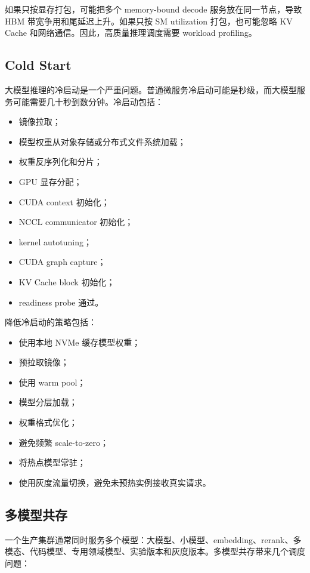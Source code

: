 如果只按显存打包，可能把多个 memory-bound decode 服务放在同一节点，导致 HBM 带宽争用和尾延迟上升。如果只按 SM utilization 打包，也可能忽略 KV Cache 和网络通信。因此，高质量推理调度需要 workload profiling。

\subsection{Cold Start}
\label{subsec:cold-start}

大模型推理的冷启动是一个严重问题。普通微服务冷启动可能是秒级，而大模型服务可能需要几十秒到数分钟。冷启动包括：

\begin{itemize}
  \item 镜像拉取；
  \item 模型权重从对象存储或分布式文件系统加载；
  \item 权重反序列化和分片；
  \item GPU 显存分配；
  \item CUDA context 初始化；
  \item NCCL communicator 初始化；
  \item kernel autotuning；
  \item CUDA graph capture；
  \item KV Cache block 初始化；
  \item readiness probe 通过。
\end{itemize}

降低冷启动的策略包括：

\begin{itemize}
  \item 使用本地 NVMe 缓存模型权重；
  \item 预拉取镜像；
  \item 使用 warm pool；
  \item 模型分层加载；
  \item 权重格式优化；
  \item 避免频繁 scale-to-zero；
  \item 将热点模型常驻；
  \item 使用灰度流量切换，避免未预热实例接收真实请求。
\end{itemize}

\subsection{多模型共存}
\label{subsec:multi-model-coexistence}

一个生产集群通常同时服务多个模型：大模型、小模型、embedding、rerank、多模态、代码模型、专用领域模型、实验版本和灰度版本。多模型共存带来几个调度问题：

